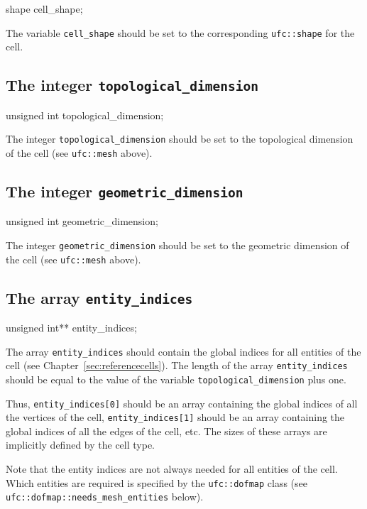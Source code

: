 \begin{code}
shape cell_shape;
\end{code}

The variable \texttt{cell\_shape} should be set to the corresponding
\texttt{ufc::shape} for the cell.

\subsection{The integer \texttt{topological\_dimension}}

\begin{code}
unsigned int topological_dimension;
\end{code}

The integer \texttt{topological\_dimension} should be set to the
topological dimension of the cell (see \texttt{ufc::mesh} above).

\subsection{The integer \texttt{geometric\_dimension}}

\begin{code}
unsigned int geometric_dimension;
\end{code}

The integer \texttt{geometric\_dimension} should be set to the
geometric dimension of the cell (see \texttt{ufc::mesh} above).

\subsection{The array \texttt{entity\_indices}}

\begin{code}
unsigned int** entity_indices;
\end{code}

The array \texttt{entity\_indices} should contain the global indices
for all entities of the cell (see Chapter~\ref{sec:referencecells}).
The length of the array \texttt{entity\_indices} should be equal to
the value of the variable \texttt{topological\_dimension} plus one.

Thus, \texttt{entity\_indices[0]} should be an array containing the
global indices of all the vertices of the cell,
\texttt{entity\_indices[1]} should be an array containing the global
indices of all the edges of the cell, etc. The sizes of these arrays
are implicitly defined by the cell type.

Note that the entity indices are not always needed for all entities of
the cell. Which entities are required is specified by the
\texttt{ufc::dofmap} class (see
\texttt{ufc::dofmap::needs\_mesh\_entities} below).

